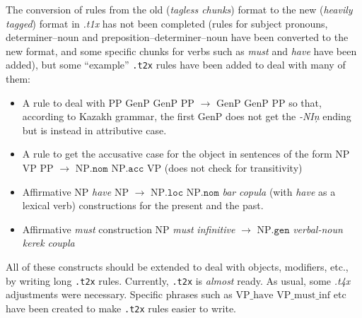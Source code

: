 \documentclass{article}
\begin{document}
The conversion of rules from the old (\emph{tagless chunks}) format to the new (\emph{heavily tagged}) format in \emph{.t1x} has not been completed (rules for subject pronouns, determiner--noun and preposition--determiner--noun have been converted to the new format, and some specific chunks for verbs such as \emph{must} and \emph{have} have been added), but some ``example'' \texttt{.t2x} rules have been added to deal with many of them:
\begin{itemize}
\item A rule to deal with  \(\mathrm{PP}\) \(\mathrm{GenP}\) \(\mathrm{GenP}\) \(\mathrm{PP}\) \(\to\) \(\mathrm{GenP}\) \(\mathrm{GenP}\) \(\mathrm{PP}\) so that, according to Kazakh grammar, the first \(\mathrm{GenP}\) does not get the \emph{-NI\c{n}} ending but is instead in attributive case.
\item A rule to get the accusative case for the object in sentences of the form \(\mathrm{NP}\) \(\mathrm{VP}\) \(\mathrm{PP}\) \(\to\) \(\mathrm{NP}\mathtt{.nom}\) \(\mathrm{NP}\mathtt{.acc}\) \(\mathrm{VP}\) (does not check for transitivity)
\item Affirmative \(\mathrm{NP}\) \emph{have} \(\mathrm{NP}\) \(\to\) \(\mathrm{NP}\mathtt{.loc}\) \(\mathrm{NP}\mathtt{.nom}\) \emph{bar} \emph{copula} (with \emph{have} as a lexical verb) constructions for the present and the past.
\item Affirmative \emph{must} construction \(\mathrm{NP}\) \emph{must} \emph{infinitive} \(\to\) \(\mathrm{NP}\mathtt{.gen}\) \emph{verbal-noun} \emph{kerek} \emph{coupla}
\end{itemize}
All of these constructs should be extended to deal with objects, modifiers, etc., by writing long \texttt{.t2x} rules. Currently, \texttt{.t2x} is \emph{almost} ready.
As usual, some \emph{.t4x} adjustments were necessary. Specific phrases such as \(\mathrm{VP\_have}\)
\(\mathrm{VP\_must\_inf}\) etc have been created to make \texttt{.t2x} rules easier to write.
\end{document}
